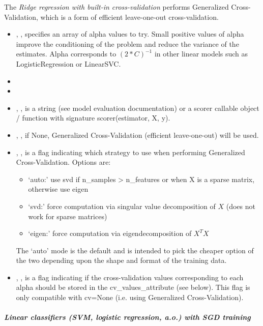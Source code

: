 The \textit{Ridge regression with built-in cross-validation} performs
Generalized Cross-Validation, which is a form of efficient leave-one-out
cross-validation.
%
\begin{itemize}
  \item {}, , specifies
  an array of alpha values to try.
  Small positive values of alpha improve the conditioning of the problem and
  reduce the variance of the estimates.
  Alpha corresponds to $(2*C)^{-1}$ in other linear models such as
  LogisticRegression or LinearSVC.
  \item {}
  \item {}
  \item {}, , is a
  string (see model evaluation documentation) or a scorer callable object /
  function with signature scorer(estimator, X, y).
  \item {}, , if
  None, Generalized Cross-Validation (efficient leave-one-out) will be used.
  \item {}, , is a flag indicating which strategy to use when performing Generalized
  Cross-Validation.
  Options are:
	\begin{itemize}
    \item `auto:' use svd if n\_samples > n\_features or when X is a
    sparse matrix, otherwise use eigen
  	\item `svd:' force computation via singular value decomposition of $X$
    (does not work for sparse matrices)
	  \item `eigen:' force computation via eigendecomposition of $X^T X$
	\end{itemize}
	The `auto' mode is the default and is intended to pick the cheaper
  option of the two depending upon the shape and format of the training data.
  \item {}, , is a flag indicating if
  the cross-validation values corresponding to each alpha should be stored in
  the cv\_values\_attribute (see below).
  This flag is only compatible with cv=None (i.e. using Generalized
  Cross-Validation).
\end{itemize}
\subparagraph{Linear classifiers (SVM, logistic regression, a.o.) with SGD
training}
\mbox{}

